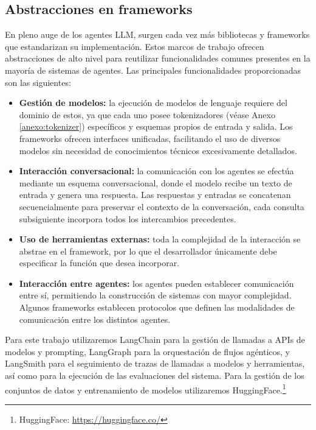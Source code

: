 


\subsection{Abstracciones en frameworks}
\label{sec:abst}
En pleno auge de los agentes LLM, surgen cada vez más bibliotecas y frameworks que estandarizan su implementación. Estos marcos de trabajo ofrecen abstracciones de alto nivel para reutilizar funcionalidades comunes presentes en la mayoría de sistemas de agentes.
Las principales funcionalidades proporcionadas son las siguientes: 
\begin{itemize}
\item {\textbf{Gestión de modelos:}} la ejecución de modelos de lenguaje requiere del dominio de estos, ya que cada uno posee tokenizadores (véase Anexo \ref{anexo:tokenizer}) específicos y esquemas propios de entrada y salida. Los frameworks ofrecen interfaces unificadas, facilitando el uso de diversos modelos sin necesidad de conocimientos técnicos excesivamente detallados.
\item {\textbf{Interacción conversacional:}} la comunicación con los agentes se efectúa mediante un esquema conversacional, donde el modelo recibe un texto de entrada y genera una respuesta. Las respuestas y entradas se concatenan secuencialmente para preservar el contexto de la conversación, cada consulta subsiguiente incorpora todos los intercambios precedentes.
\item {\textbf{Uso de herramientas externas:}} toda la complejidad de la interacción se abstrae en el framework, por lo que el desarrollador únicamente debe especificar la función que desea incorporar.
\item {\textbf{Interacción entre agentes:}} los agentes pueden establecer comunicación entre sí, permitiendo la construcción de sistemas con mayor complejidad. Algunos frameworks establecen protocolos que definen las modalidades de comunicación entre los distintos agentes.
\end{itemize}

Para este trabajo utilizaremos LangChain para la gestión de llamadas a APIs de modelos y prompting, LangGraph para la orquestación de flujos agénticos, y LangSmith para el seguimiento de trazas de llamadas a modelos y herramientas, así como para la ejecución de las evaluaciones del sistema. Para la gestión de los conjuntos de datos y entrenamiento de modelos utilizaremos HuggingFace.\footnote{HuggingFace: \url{https://huggingface.co/}}

